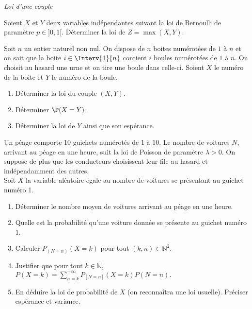 \documentclass[a4paper,10pt]{report}
\begin{document}
\begin{center}
\textit{{ {\large Loi d'une couple}}}
\end{center}

\medskip

\begin{Exa} Soient $X$ et $Y$ deux variables indépendantes suivant la loi de Bernoulli de paramètre $p \in ]0,1[$. Déterminer la loi de $Z= \max(X,Y)$.
\end{Exa}

\begin{Exa} Soit $n$ un entier naturel non nul. On dispose de $n$ boites numérotées de $1$ à $n$ et on sait que la boite $i \in \Interv{1}{n}$ contient $i$ boules numérotées de $1$ à $n$. On choisit au hasard une urne et on tire une boule dans celle-ci. Soient $X$ le numéro de la boite et $Y$ le numéro de la boule. 

\begin{enumerate}
\item Déterminer la loi du couple $(X,Y)$.
\item Déterminer $\P(X=Y)$.
\item Déterminer la loi de $Y$ ainsi que son espérance.
\end{enumerate}
\end{Exa}

\begin{Exa} Un péage comporte 10 guichets numérotés de 1 à 10. Le nombre de voitures $N$, arrivant au péage en une heure, suit la loi de Poisson de paramètre $\lambda>0$. On suppose de plus que les conducteurs choisissent leur file au hasard et indépendamment des autres.\\
Soit $X$ la variable aléatoire égale au nombre de voitures se présentant au guichet numéro 1.
\begin{enumerate}
\item Déterminer le nombre moyen de voitures arrivant au péage en une heure.
\item Quelle est la probabilité qu'une voiture donnée se présente au guichet numéro 1.
\item Calculer $P_{(N=n)}(X=k)$ pour tout $(k,n) \in \mathbb{N}^2$.
\item Justifier que pour tout $k \in \mathbb{N}$, $\displaystyle{P(X=k)=\sum_{n=k}^{+\infty}P_{[N=n]}(X=k) P(N=n).}$
\item En déduire la loi de probabilité de $X$ (on reconnaîtra une loi usuelle). Préciser espérance et variance.
\end{enumerate}
\end{Exa}
\end{document}
